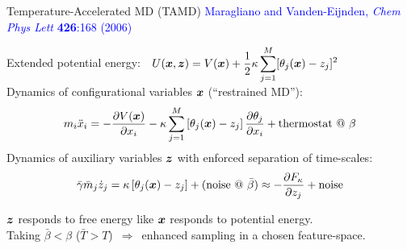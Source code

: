 \begin{frame}[fragile]{Temperature-Accelerated MD (TAMD)}
\vspace{-5mm}
\textcolor{blue}{\tiny Maragliano and Vanden-Eijnden, {\it Chem Phys Lett} {\bf 
426}:168 (2006)}

Extended potential energy:\ \ $\displaystyle U({\boldsymbol x},{\boldsymbol z}) = V({\boldsymbol x}) + 
\frac{1}{2}\kappa\sum_{j=1}^{M}[\theta_j({\boldsymbol x})-z_j]^2$\\
Dynamics of configurational variables ${\boldsymbol x}$ (``restrained MD''):
\begin{displaymath}
m_i\ddot{x}_i = -\frac{\partial V({\boldsymbol x})}{\partial 
x_i}-\kappa\sum_{j=1}^{M}\left[\theta_j({\boldsymbol x})-z_j\right]\frac{\partial\theta_j}{
\partial x_i}+\mbox{thermostat @ $\beta$}
\end{displaymath}
Dynamics of auxiliary variables ${\boldsymbol z}$ with enforced separation of time-scales:
\begin{displaymath}
\bar\gamma\bar{m}_j\dot{z}_j = \kappa\left[\theta_j({\boldsymbol x})-z_j\right] + 
(\mbox{noise @ $\bar\beta$}) \approx -\frac{\partial F_{\kappa}}{\partial z_j} + 
\mbox{noise}
\end{displaymath}

${\boldsymbol z}$ responds to free energy like ${\boldsymbol x}$ responds to potential energy.\\
Taking $\bar\beta < \beta$ ($\bar{T} > T$)\ $\Rightarrow$\ enhanced sampling in 
a chosen feature-space.

\end{frame}

